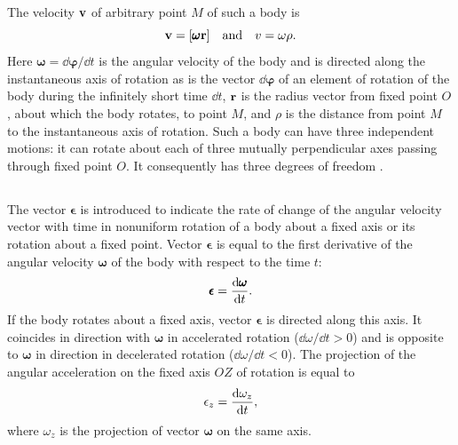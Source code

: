The velocity $\vb{v}$ of arbitrary point $M$ of such a body is 
\begin{equation*}%
\vb{v} = [\pmb{\omega}\vb{r}] \qand v = \omega\rho.
\end{equation*}
Here $\pmb{\omega} = \dd \pmb{\varphi}/\dd t$ is the angular velocity of the body and is directed along the instantaneous axis of rotation as is the vector­ $\dd \pmb{\varphi}$ of an element of rotation of the body during the infinitely short time $\dd t$, $\vb{r}$ is the radius vector from fixed point $O$, about which the body rotates, to point $M$, and $\rho$ is the distance from point $M$ to the instantaneous axis of rotation. Such a body can have three independent motions: it can rotate about each of three mutually perpendicular axes passing through fixed point $O$. It consequently has three degrees of freedom .

\subsection{}\label{1.5.7} The  vector $\pmb{\epsilon}$ is introduced to indicate the rate of change of the angular velocity vector with time in nonuniform rotation of a body about a fixed axis or its rotation about a fixed point. Vector $\pmb{\epsilon}$ is equal to the first derivative of the angular velocity $\pmb{\omega}$ of the body with respect to the time $t$:
\begin{equation*}%
\pmb{\epsilon} = \dv{\pmb{\omega}}{t}.
\end{equation*}
If the body rotates about a fixed axis, vector $\pmb{\epsilon}$ is directed along this axis. It coincides in direction with $\pmb{\omega}$ in accelerated rota­tion ($\dd\omega /\dd t > 0$) and is opposite to $\pmb{\omega}$ in direction in decelerated rotation ($\dd\omega /\dd t < 0$). The projection of the angular acceleration on the fixed axis $OZ$ of rotation is equal to 
\begin{equation*}%
\epsilon_{z} = \dv{\omega_{z}}{t},
\end{equation*}
where $\omega_{z}$ is the projection of vector $\pmb{\omega}$ on the same axis.

